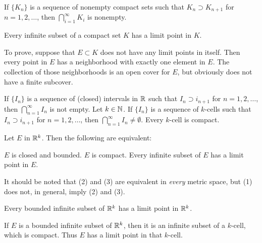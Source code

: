 \documentclass{article}
\begin{document}
\begin{corollary}
    If $\{K_{n}\}$ is a sequence of nonempty compact sets such that $K_{n}\supset K_{n+1}$ for $n=1,2,\dotsc$, then $\bigcap_{i=1}^{\infty}K_{i}$ is nonempty.
\end{corollary}
\begin{theorem}
    Every infinite subset of a compact set $K$ has a limit point in $K$.
\end{theorem}
\begin{remark}
    To prove, suppose that $E\subset K$ does not have any limit points in itself. Then every point in $E$ has a neighborhood with exactly one element in $E$. The collection of those neighborhoods is an open cover for $E$, but obviously does not have a finite subcover.
\end{remark}
\begin{theorem}
\listhack 
\begin{enumerate}
    \ii If $\{I_{n}\}$ is a sequence of (closed) intervals in $\mathbb R$ such that $I_{n}\supset i_{n+1}$ for $n=1,2,\dotsc$, then $\bigcap_{n=1}^{\infty}I_{n}$ is not empty.
    \ii Let $k\in\mathbb N$. If $\{I_{n}\}$ is a sequence of $k$-cells such that $I_{n}\supset i_{n+1}$ for $n=1,2,\dotsc$, then $\bigcap_{n=1}^{\infty}I_{n}\neq\emptyset$.
    \ii Every $k$-cell is compact.
\end{enumerate}
\end{theorem}
\begin{theorem}
     Let $E$ in $\mathbb R^{k}$. Then the following are equivalent:
     \begin{enumerate}
        \ii $E$ is closed and bounded.
        \ii $E$ is compact.
        \ii Every infinite subset of $E$ has a limit point in $E$.
     \end{enumerate}
\end{theorem}
\begin{remark}It should be noted that (2) and (3) are equivalent in \textit{every} metric space, but (1) does not, in general, imply (2) and (3).
\end{remark}
\begin{theorem}[Weierstrass]
    Every bounded infinite subset of $\mathbb R^{k}$ has a limit point in $\mathbb R^{k}$.
\end{theorem}
\begin{remark}
    If $E$ is a bounded infinite subset of $\mathbb R^{k}$, then it is an infinite subset of a $k$-cell, which is compact. Thus $E$ has a limit point in that $k$-cell.
\end{remark}
\end{document}
